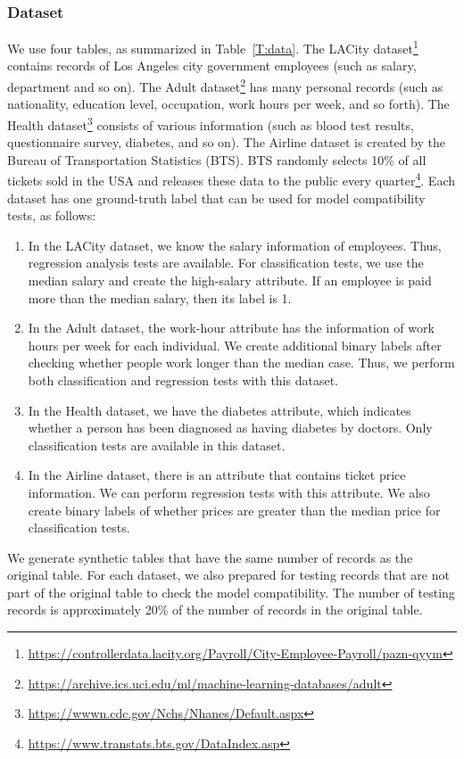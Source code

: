 \subsubsection{Dataset} We use four tables, as summarized in Table~\ref{T:data}. The LACity dataset\footnote{\url{https://controllerdata.lacity.org/Payroll/City-Employee-Payroll/pazn-qyym}} contains records of Los Angeles city government employees (such as salary, department and so on). The Adult dataset\footnote{\url{https://archive.ics.uci.edu/ml/machine-learning-databases/adult}} has many personal records (such as nationality, education level, occupation, work hours per week, and so forth). The Health dataset\footnote{\url{https://wwwn.cdc.gov/Nchs/Nhanes/Default.aspx}} consists of various information (such as blood test results, questionnaire survey, diabetes, and so on). The Airline dataset is created by the Bureau of Transportation Statistics (BTS). BTS randomly selects 10\% of all tickets sold in the USA and releases these data to the public every quarter\footnote{\url{https://www.transtats.bts.gov/DataIndex.asp}}. Each dataset has one ground-truth label that can be used for model compatibility tests, as follows:
\begin{enumerate}
\item In the LACity dataset, we know the salary information of employees. Thus, regression analysis tests are available. For classification tests, we use the median salary and create the high-salary attribute.  If an employee is paid more than the median salary, then its label is 1.
\item In the Adult dataset, the work-hour attribute has the information of work hours per week for each individual. We create additional binary labels after checking whether people work longer than the median case. Thus, we perform both classification and regression tests with this dataset.
\item In the Health dataset, we have the diabetes attribute, which indicates whether a person has been diagnosed as having diabetes by doctors. Only classification tests are available in this dataset.
\item In the Airline dataset, there is an attribute that contains ticket price information. We can perform regression tests with this attribute. We also create binary labels of whether prices are greater than the median price for classification tests.
\end{enumerate}

We generate synthetic tables that have the same number of records as the original table. For each dataset, we also prepared for testing records that are not part of the original table to check the model compatibility. The number of testing records is approximately 20\% of the number of records in the original table.

